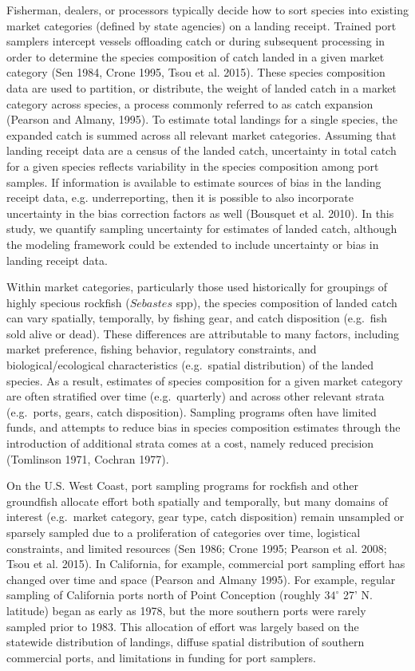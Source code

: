 \documentclass[12pt]{article}
\begin{document}
Fisherman, dealers, or processors typically decide how to sort species
into existing market categories (defined by state agencies) on a landing 
receipt. Trained port samplers intercept vessels offloading catch or during 
subsequent processing in order to determine the species composition of catch 
landed in a given market category (Sen 1984, Crone 1995, Tsou et al. 2015). 
These species composition data are used to partition, or distribute, the 
weight of landed catch in a market category across species, a process 
commonly referred to as catch expansion (Pearson and Almany, 1995). To 
estimate total landings for a single species, the expanded catch is summed 
across all relevant market categories. Assuming that landing receipt data 
are a census of the landed catch, uncertainty in total catch for a 
given species reflects variability in the species composition among 
port samples. If information is available to estimate sources of bias in 
the landing receipt data, e.g. underreporting, then it is possible to 
also incorporate uncertainty in the bias correction factors as well 
(Bousquet et al. 2010). In this study, we quantify sampling uncertainty 
for estimates of landed catch, although the modeling framework could be
extended to include uncertainty or bias in landing receipt data.

Within market categories, particularly those used historically for
groupings of highly specious rockfish ($Sebastes$ spp), the species
composition of landed catch can vary spatially, temporally, by fishing
gear, and catch disposition (e.g.~fish sold alive or dead). These
differences are attributable to many factors, including market
preference, fishing behavior, regulatory constraints, and
biological/ecological characteristics (e.g.~spatial distribution) of the
landed species. As a result, estimates of species composition for a
given market category are often stratified over time (e.g.~quarterly)
and across other relevant strata (e.g.~ports, gears, catch disposition). 
Sampling programs often have limited funds, and attempts to reduce
bias in species composition estimates through the introduction of
additional strata comes at a cost, namely reduced precision (Tomlinson 1971, 
Cochran 1977).

On the U.S. West Coast, port sampling programs for rockfish and other
groundfish allocate effort both spatially and temporally, but many
domains of interest (e.g.~market category, gear type, catch disposition)
remain unsampled or sparsely sampled due to a proliferation of
categories over time, logistical constraints, and limited resources (Sen
1986; Crone 1995; Pearson et al. 2008; Tsou et al. 2015). In California,
for example, commercial port sampling effort has changed over time and
space (Pearson and Almany 1995). For example, regular sampling of
California ports north of Point Conception (roughly \(34^{\circ}\) 27'
N. latitude) began as early as 1978, but the more southern ports were
rarely sampled prior to 1983. This allocation of effort was largely
based on the statewide distribution of landings, diffuse spatial
distribution of southern commercial ports, and limitations in funding
for port samplers.
\end{document}
